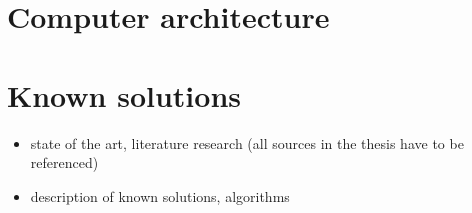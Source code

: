 \section{Computer architecture}

    

\section{Known solutions}


\begin{itemize}
    \item state of the art, literature research (all sources in the thesis have to be referenced)
    \item description of known solutions, algorithms
\end{itemize}
